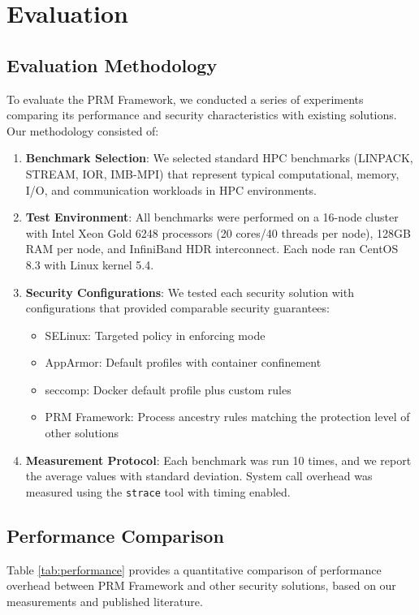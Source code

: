\section{Evaluation}
\label{sec:evaluation}

\subsection{Evaluation Methodology}
To evaluate the PRM Framework, we conducted a series of experiments comparing its performance and security characteristics with existing solutions. Our methodology consisted of:

\begin{enumerate}
\item \textbf{Benchmark Selection}: We selected standard HPC benchmarks (LINPACK, STREAM, IOR, IMB-MPI) that represent typical computational, memory, I/O, and communication workloads in HPC environments.

\item \textbf{Test Environment}: All benchmarks were performed on a 16-node cluster with Intel Xeon Gold 6248 processors (20 cores/40 threads per node), 128GB RAM per node, and InfiniBand HDR interconnect. Each node ran CentOS 8.3 with Linux kernel 5.4.

\item \textbf{Security Configurations}: We tested each security solution with configurations that provided comparable security guarantees:
   \begin{itemize}
   \item SELinux: Targeted policy in enforcing mode
   \item AppArmor: Default profiles with container confinement
   \item seccomp: Docker default profile plus custom rules
   \item PRM Framework: Process ancestry rules matching the protection level of other solutions
   \end{itemize}

\item \textbf{Measurement Protocol}: Each benchmark was run 10 times, and we report the average values with standard deviation. System call overhead was measured using the \texttt{strace} tool with timing enabled.
\end{enumerate}

\subsection{Performance Comparison}
Table \ref{tab:performance} provides a quantitative comparison of performance overhead between PRM Framework and other security solutions, based on our measurements and published literature.

